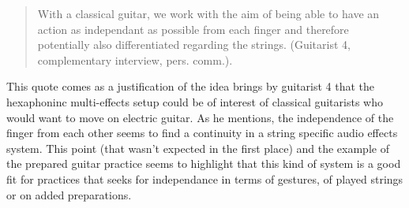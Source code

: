 \documentclass{article}
\begin{document}
\begin{quote}
With a classical guitar, we work with the aim of being able to have an action as independant as possible from each finger and therefore potentially also differentiated regarding the strings. (Guitarist 4, complementary interview, pers. comm.).
\end{quote}

This quote comes as a justification of the idea brings by guitarist 4 that the hexaphoninc multi-effects setup could be of interest of classical guitarists who would want to move on electric guitar. As he mentions, the independence of the finger from each other seems to find a continuity in a string specific audio effects system. This point (that wasn't expected in the first place) and the example of the prepared guitar practice seems to highlight that this kind of system is a good fit for practices that seeks for independance in terms of gestures, of played strings or on added preparations.

%


\end{document}
